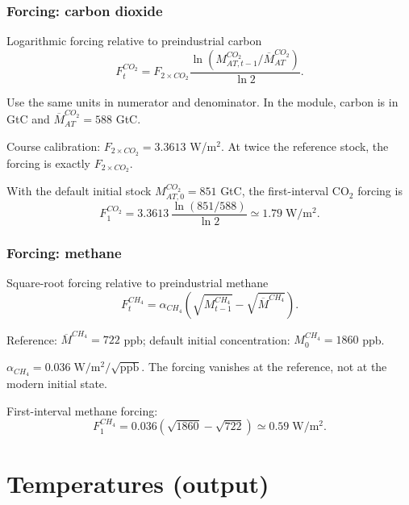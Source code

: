 \documentclass[xcolor=x11names,compress,aspectratio=169]{beamer}%
\makeatletter
\renewenvironment{itemize}{\begin{compactitemize}[<+-| alert@+>]}{\end{compactitemize}}
\makeatother
\begin{document}
\begin{frame}
\frametitle{Forcing: carbon dioxide}
\begin{block}{Logarithmic forcing relative to preindustrial carbon}
\[
F^{CO_2}_t=F_{2\times CO_2}
\frac{\ln\!\left(M^{CO_2}_{AT,t-1}/\overline M^{CO_2}_{AT}\right)}{\ln 2}.
\]
\end{block}
\begin{itemize}
\item Use the same units in numerator and denominator.
In the module, carbon is in GtC and $\overline M^{CO_2}_{AT}=588$ GtC.
\item Course calibration: $F_{2\times CO_2}=3.3613$ W/m$^2$.
At twice the reference stock, the forcing is exactly $F_{2\times CO_2}$.
\item With the default initial stock $M^{CO_2}_{AT,0}=851$ GtC,
the first-interval CO$_2$ forcing is
\[
F^{CO_2}_1=3.3613\,\frac{\ln(851/588)}{\ln 2}
\simeq 1.79\;\mathrm{W/m^2}.
\]
\end{itemize}
\transboxout
\end{frame}
%

\begin{frame}
\frametitle{Forcing: methane}
\begin{block}{Square-root forcing relative to preindustrial methane}
\[
F^{CH_4}_t=\alpha_{CH_4}
\left(\sqrt{M^{CH_4}_{t-1}}-\sqrt{\overline M^{CH_4}}\right).
\]
\end{block}
\begin{itemize}
\item Reference: $\overline M^{CH_4}=722$ ppb;
default initial concentration: $M^{CH_4}_0=1860$ ppb.
\item $\alpha_{CH_4}=0.036\;\mathrm{W/m^2}/\sqrt{\mathrm{ppb}}$.
The forcing vanishes at the reference, not at the modern initial state.
\item First-interval methane forcing:
\[
F^{CH_4}_1=0.036\left(\sqrt{1860}-\sqrt{722}\right)
\simeq 0.59\;\mathrm{W/m^2}.
\]
\end{itemize}
\transboxout
\end{frame}


\section{Temperatures (output)}%
\end{document}
